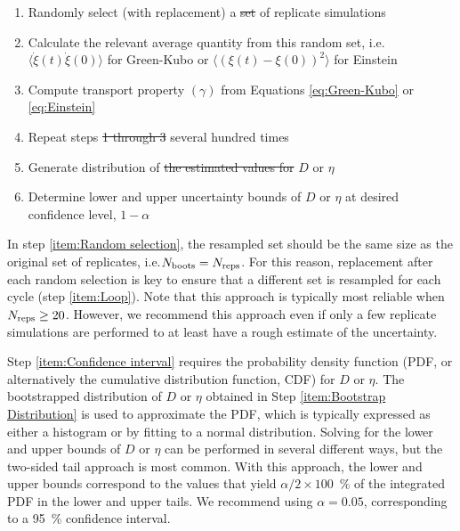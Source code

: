 \documentclass[9pt,bestpractices]{livecoms}
\providecommand{\DIFadd}[1]{{\protect\color{blue}\uwave{#1}}} %
\providecommand{\DIFdel}[1]{{\protect\color{red}\sout{#1}}}                      %
\providecommand{\DIFaddbegin}{} %
\providecommand{\DIFaddend}{} %
\providecommand{\DIFdelbegin}{} %
\providecommand{\DIFdelend}{} %
\begin{document}
\begin{enumerate}
	\item Randomly select (with replacement) a \DIFdelbegin \DIFdel{set }\DIFdelend \DIFaddbegin \DIFadd{subset }\DIFaddend of replicate simulations \label{item:Random selection}
	\item Calculate the relevant average quantity from this random set, i.e.\DIFaddbegin \DIFadd{, }\DIFaddend $\langle\dot{\xi}(t)\dot{\xi}(0)\rangle$ for Green-Kubo or $\langle (\xi(t)-\xi(0))^2 \rangle$ for Einstein
	\item Compute transport property $(\gamma)$ from Equations \ref{eq:Green-Kubo} or \ref{eq:Einstein} \DIFaddbegin \label{item:Compute property}
	\DIFaddend \item Repeat steps \DIFdelbegin \DIFdel{1 through 3 }\DIFdelend \DIFaddbegin \DIFadd{\ref{item:Random selection} through \ref{item:Compute property} }\DIFaddend several hundred times \label{item:Loop}
	\item Generate distribution of \DIFdelbegin \DIFdel{the estimated values for }\DIFdelend $D$ or $\eta$ \DIFaddbegin \DIFadd{values from step \ref{item:Loop} }\DIFaddend \label{item:Bootstrap Distribution}
	\item Determine lower and upper uncertainty bounds of $D$ or $\eta$ at desired confidence level, $1-\alpha$ \label{item:Confidence interval}
\end{enumerate}
In step \ref{item:Random selection}, the resampled set should be the same size as the original set of replicates, i.e.\DIFaddbegin \DIFadd{, }\DIFaddend $N_{\rm boots} = N_{\rm reps}$. For this reason, replacement after each random selection is key to ensure that a different set is resampled for each cycle (step \ref{item:Loop}). Note that this approach is typically most reliable when $N_{\rm reps} \ge 20$. However, we recommend this approach even if only a few replicate simulations are performed to at least have a rough estimate of the uncertainty.

Step \ref{item:Confidence interval} requires the probability density function (PDF, or alternatively the cumulative distribution function, CDF) for $D$ or $\eta$. The bootstrapped distribution of $D$ or $\eta$ obtained in Step \ref{item:Bootstrap Distribution} is used to approximate the PDF, which is typically expressed as either a histogram or by fitting to a normal distribution. Solving for the lower and upper bounds of $D$ or $\eta$ can be performed in several different ways, but the two-sided tail approach is most common. With this approach, the lower and upper bounds correspond to the values that yield $\alpha/2 \times 100$~\% of the integrated PDF in the lower and upper tails. We recommend using $\alpha = 0.05$, corresponding to a 95~\% confidence interval.
\end{document}

